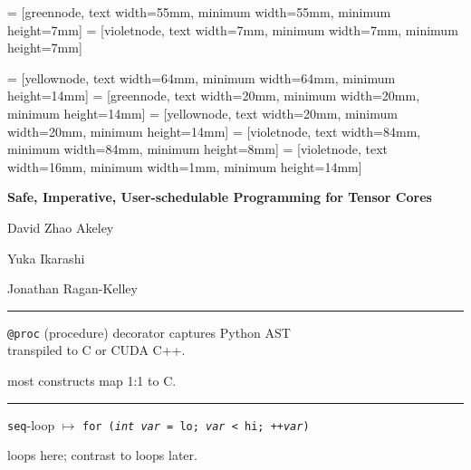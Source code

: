  = [greennode, text width=55mm, minimum width=55mm, minimum height=7mm]
 = [violetnode, text width=7mm, minimum width=7mm, minimum height=7mm]

 = [yellownode, text width=64mm, minimum width=64mm, minimum height=14mm]
 = [greennode, text width=20mm, minimum width=20mm, minimum height=14mm]
 = [yellownode, text width=20mm, minimum width=20mm, minimum height=14mm]
 = [violetnode, text width=84mm, minimum width=84mm, minimum height=8mm]
 = [violetnode, text width=16mm, minimum width=1mm, minimum height=14mm]
\newcommand{\consumerBox}[1]{{\color{greenBoxFg}\colorbox{greenBoxBg}{#1}}}
\newcommand{\producerBox}[1]{{\color{yellowBoxFg}\colorbox{yellowBoxBg}{#1}}}


\textbf{\hfill \Large Safe, Imperative, User-schedulable Programming for Tensor Cores}

{\LARGE

\vfill

David Zhao Akeley

Yuka Ikarashi

Jonathan Ragan-Kelley

\hfill {}}


\newpage
{}

{\large

}

\vspace{3mm}
\hrule

{\LARGE
\texttt{@proc} (procedure) decorator captures Python AST\\transpiled to C or CUDA C++.

 most constructs map 1:1 to C.

}

\newpage
{}

{\large

}

\vspace{3mm}
\hrule

{\LARGE
\texttt{seq}-loop $\mapsto$ \texttt{for (\textit{int var} = lo; \textit{var} < hi; ++\textit{var})}

 loops here; contrast to  loops later.

}

